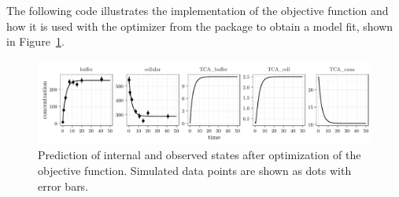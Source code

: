 \documentclass[article]{jss}
\begin{document}
The following code illustrates the implementation of the objective function and how it is used with the  optimizer from the  package to obtain a model fit, shown in Figure~\ref{fig:myfit}.

\begin{CodeChunk}
\end{CodeChunk}


\begin{figure}[ht]
	\centering
	\includegraphics[width = \textwidth]{images/figure4}
	\caption{Prediction of internal and observed states after optimization of the objective function. Simulated data points are shown as dots with error bars.}
	\label{fig:myfit}
\end{figure}
\end{document}
